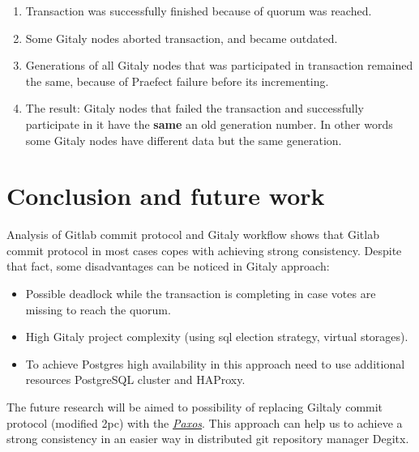 \documentclass[acmlarge, screen, nonacm]{acmart}
\begin{document}
\begin{enumerate}
\item Transaction was successfully finished because of quorum was reached.
\item Some Gitaly nodes aborted transaction, and became outdated.
\item Generations of all Gitaly nodes that was participated in transaction remained the same, because of Praefect failure before its incrementing.
\item The result: Gitaly nodes that failed the transaction and successfully participate in it have the \textbf{same} an old generation number. In other words some Gitaly nodes have different data but the same generation.
\end{enumerate}


\section{Conclusion and future work}

Analysis of Gitlab commit protocol and Gitaly workflow shows that Gitlab commit protocol in most cases
copes with achieving strong consistency. Despite that 
fact, some disadvantages can be noticed in Gitaly approach:
\begin{itemize}
\item Possible deadlock while the transaction is completing in case votes are missing to reach the quorum.
\item High Gitaly project complexity (using sql election strategy, virtual storages).
\item To achieve Postgres high availability in this approach need to use additional resources PostgreSQL cluster and HAProxy. 
\end{itemize}
The future research will be aimed to possibility of replacing Giltaly commit protocol (modified 2pc) 
with the \emph{\href{https://en.wikipedia.org/wiki/Paxos_(computer_science)}{Paxos}}. This approach can help us to achieve 
a strong consistency in an easier way in distributed git repository manager Degitx.
\end{document}
